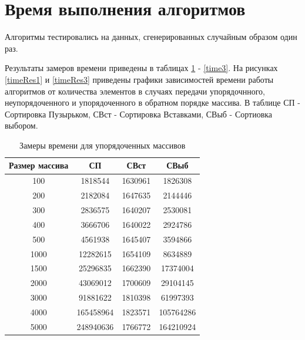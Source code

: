 \documentclass[12pt]{report}
\begin{document}
\section{Время выполнения алгоритмов}
Алгоритмы тестировались на данных, сгенерированных случайным образом один раз.

Результаты замеров времени приведены в таблицах \ref{time1} - \ref{time3}. На рисунках \ref{timeRes1} и \ref{timeRes3} приведены графики зависимостей времени работы алгоритмов от количества элементов в случаях передачи упорядочнного, неупорядоченного и упорядоченного в обратном порядке массива. В таблице СП - Сортировка Пузырьком, СВст - Сортировка Вставками, СВыб - Сортиовка выбором.

\newpage
\begin{table}[h]
	\begin{center}
		\caption{\label{time1} Замеры времени для упорядоченных массивов}
		\begin{tabular}{|c c c c|} 
 			\hline
			Размер массива & СП & СВст & СВыб \\ [0.5ex] 
 			\hline\hline
 			100 & 1818544 & 1630961 & 1826308\\
 			\hline
 			200 & 2182084 & 1647635 & 2144446 \\
 			\hline
			300 & 2836575 & 1640207 & 2530081\\
			\hline
			400 & 3666706 & 1640022 & 2924786\\
			\hline
			500 & 4561938 & 1645407 & 3594866\\
			\hline
			1000 & 12282615 & 1654109 & 8634889\\
			\hline
			1500 & 25296835 & 1662390 & 17374004\\
			\hline
			2000 & 43069012 & 1700609 & 29104145\\
			\hline
			3000 & 91881622 & 1810398 & 61997393\\
			\hline
			4000 & 165458964 & 1823571 & 105764286\\
			\hline
			5000 & 248940636 & 1766772 & 164210924\\
			\hline
			\end{tabular}
	\end{center}
\end{table}
\end{document}

